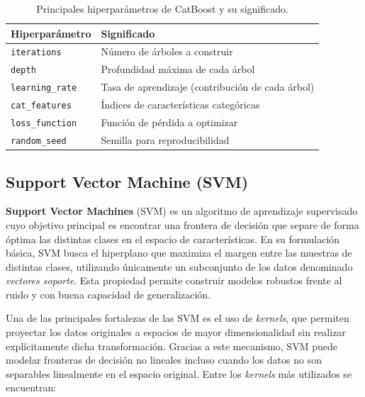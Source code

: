 \begin{table}[H]
    \centering
    \caption{Principales hiperparámetros de CatBoost y su significado.}
    \label{tab:catboost_hyperparams}
    \begin{tabular}{ll}
        \toprule
        \textbf{Hiperparámetro} & \textbf{Significado} \\
        \midrule
        \texttt{iterations} & Número de árboles a construir \\
        \texttt{depth} & Profundidad máxima de cada árbol \\
        \texttt{learning\_rate} & Tasa de aprendizaje (contribución de cada árbol) \\
        \texttt{cat\_features} & Índices de características categóricas \\
        \texttt{loss\_function} & Función de pérdida a optimizar \\
        \texttt{random\_seed} & Semilla para reproducibilidad \\
        \bottomrule
    \end{tabular}
\end{table}


\subsection{Support Vector Machine (SVM)}

\textbf{Support Vector Machines} (SVM) es un algoritmo de aprendizaje supervisado cuyo objetivo principal es encontrar una frontera de decisión que separe de forma óptima las distintas clases en el espacio de características. En su formulación básica, SVM busca el hiperplano que maximiza el margen entre las muestras de distintas clases, utilizando únicamente un subconjunto de los datos denominado \textit{vectores soporte}. Esta propiedad permite construir modelos robustos frente al ruido y con buena capacidad de generalización.

Una de las principales fortalezas de las SVM es el uso de \textit{kernels}, que permiten proyectar los datos originales a espacios de mayor dimensionalidad sin realizar explícitamente dicha transformación. Gracias a este mecanismo, SVM puede modelar fronteras de decisión no lineales incluso cuando los datos no son separables linealmente en el espacio original. Entre los \textit{kernels} más utilizados se encuentran:

